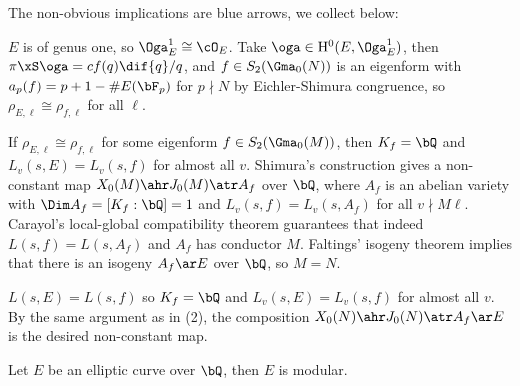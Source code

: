 \documentclass[a4paper, twoside]{article}
\begin{document}
\begin{prf}
	The non-obvious implications are blue arrows, we collect below:

	\begin{enr}[label = (\arabic*)]
		\item $E$ is of genus one, so $\Oga_{E}^{1}\cong\cO_{E}$. Take $\oga\in \mathrm{H}_{}^{0}(E,\Oga_{E}^{1})$, then $\pi\xS\oga=cf(q)\dif{q}/q$, and $f\in S_{2}(\Gma_{0}(N))$ is an eigenform with $a_{p}(f)=p+1-\#E(\bF_{p})$ for $p\nmid N$ by Eichler-Shimura congruence, so $\rho_{E,\ell}\cong\rho_{f,\ell}$ for all $\ell$.
		\item If $\rho_{E,\ell}\cong\rho_{f,\ell}$ for some eigenform $f\in S_{2}(\Gma_{0}(M))$, then $K_{f}=\bQ$ and $L_{v}(s,E)=L_{v}(s,f)$ for almost all $v$. Shimura's construction\cite[7.14]{Shimura1971AF} gives a non-constant map $X_{0}(M)\ahr J_{0}(M)\atr A_{f}$ over $\bQ$, where $A_{f}$ is an abelian variety with $\Dim A_{f}=[K_{f}:\bQ]=1$ and $L_{v}(s,f)=L_{v}(s,A_{f})$ for all $v\nmid M\ell$. Carayol's local-global compatibility theorem\cite[0.8]{Carayol1986Representations} guarantees that indeed $L(s,f)=L(s,A_{f})$ and $A_{f}$ has conductor $M$. Faltings' isogeny theorem\cite[Page~361]{Faltings1983Mordell} implies that there is an isogeny $A_{f}\ar E$ over $\bQ$, so $M=N$.
		\item $L(s,E)=L(s,f)$ so $K_{f}=\bQ$ and $L_{v}(s,E)=L_{v}(s,f)$ for almost all $v$. By the same argument as in (2), the composition $X_{0}(N)\ahr J_{0}(N)\atr A_{f}\ar E$ is the desired non-constant map.
	\end{enr}
\end{prf}

\begin{thm}
	Let $E$ be an elliptic curve over $\bQ$, then $E$ is modular.
\end{thm}
\end{document}
